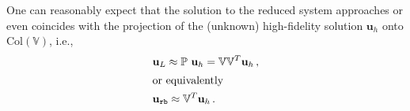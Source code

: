 \documentclass[12pt, a4paper, twoside, openright, notitlepage]{report}
\numberwithin{equation}{chapter}
\theoremstyle{theorem}
\theoremstyle{definition}
\theoremstyle{remark}
\theoremstyle{proposition}
\numberwithin{figure}{chapter}
\begin{document}
		One can reasonably expect that the solution to the reduced system approaches or even coincides with the projection of the (unknown) high-fidelity solution $\mathbf{u}_h$ onto $\text{Col}(\mathbb{V})$, i.e., 
		\begin{subequations}
			\label{eq:good-rb-solution}
			\begin{align}
				& \mathbf{u}_L \approx \mathbb{P} ~ \mathbf{u}_h = \mathbb{V} \mathbb{V}^T \mathbf{u}_h \, , \\
				\intertext{or equivalently}
				& \mathbf{u}_{\texttt{rb}} \approx \mathbb{V}^T \mathbf{u}_h \, .
			\end{align}
		\end{subequations}
		
\end{document}
